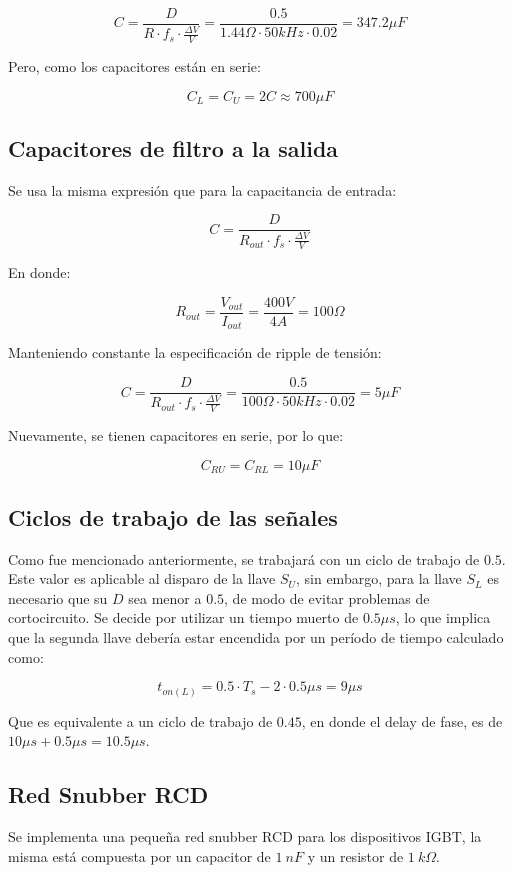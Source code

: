 $$
C=\frac{D}{R \cdot f_s \cdot \frac{\Delta V}{V}} = \frac{0.5}{1.44 \Omega \cdot 50kHz \cdot 0.02 }=347.2 \mu F
$$

Pero, como los capacitores están en serie:

$$
C_L=C_U=2C \approx 700 \mu F
$$

\subsection{Capacitores de filtro a la salida}

Se usa la misma expresión que para la capacitancia de entrada:

$$
C=\frac{D}{R_{out} \cdot f_s \cdot \frac{\Delta V}{V}}
$$

En donde:

$$
R_{out}=\frac{V_{out}}{I_{out}}=\frac{400V}{4A}=100 \Omega
$$

Manteniendo constante la especificación de ripple de tensión:

$$
C=\frac{D}{R_{out} \cdot f_s \cdot \frac{\Delta V}{V}}=\frac{0.5}{100\Omega \cdot 50kHz \cdot 0.02}=5 \mu F
$$

Nuevamente, se tienen capacitores en serie, por lo que:

$$
C_{RU}=C_{RL}=10 \mu F
$$

\subsection{Ciclos de trabajo de las señales}

Como fue mencionado anteriormente, se trabajará con un ciclo de trabajo de $0.5$. Este valor es aplicable al disparo de la llave $S_U$, sin embargo, para la llave $S_L$ es necesario que su $D$ sea menor a $0.5$, de modo de evitar problemas de cortocircuito. Se decide por utilizar un tiempo muerto de $0.5 \mu s$, lo que implica que la segunda llave debería estar encendida por un período de tiempo calculado como:

$$
t_{on(L)}=0.5\cdot T_s-2 \cdot 0.5 \mu s=9\mu s
$$

Que es equivalente a un ciclo de trabajo de $0.45$, en donde el delay de fase, es de $10 \mu s+0.5 \mu s=10.5 \mu s$.

\subsection{Red Snubber RCD}

Se implementa una pequeña red snubber RCD para los dispositivos IGBT, la misma está compuesta por un capacitor de $1 \ nF$ y un resistor de $1 \ k \Omega$.


